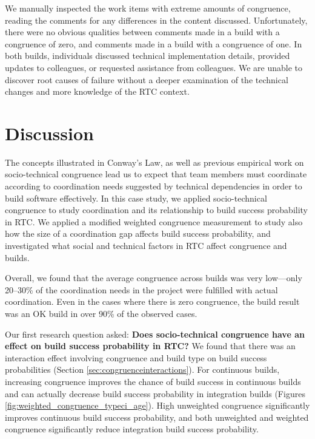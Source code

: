 \documentclass[12pt,oneside]{book}
\begin{document}
We manually inspected the work items with extreme amounts of congruence, reading the comments for any differences in the content discussed. Unfortunately, there were no obvious qualities between comments made in a build with a congruence of zero, and comments made in a build with a congruence of one. In both builds, individuals discussed technical implementation details, provided updates to colleagues, or requested assistance from colleagues. We are unable to discover root causes of failure without a deeper examination of the technical changes and more knowledge of the RTC context.


\section{Discussion}
\label{sec:discussion}

The concepts illustrated in Conway's Law, as well as previous empirical work on socio-technical congruence lead us to expect that team members must coordinate according to coordination needs suggested by technical dependencies in order to build software effectively.
In this case study, we applied socio-technical congruence to study coordination and its relationship to build success probability in RTC. We applied a modified weighted congruence measurement to study also how the size of a coordination gap affects build success probability, and investigated what social and technical factors in RTC affect congruence and builds.

Overall, we found that the average congruence across builds was very low---only 20--30\% of the coordination needs in the project were fulfilled with actual coordination. Even in the cases where there is zero congruence, the build result was an OK build in over 90\% of the observed cases.

Our first research question asked:
\textbf{Does socio-technical congruence have an effect on build success probability in RTC?}
We found that there was an interaction effect involving congruence and build type on build success probabilities (Section \ref{sec:congruenceinteractions}). For continuous builds, increasing congruence improves the chance of build success in continuous builds and can actually decrease build success probability in integration builds (Figures \ref{fig:weighted_congruence_typeci_age}). High unweighted congruence significantly improves continuous build success probability, and both unweighted and weighted congruence significantly reduce integration build success probability.
\end{document}
